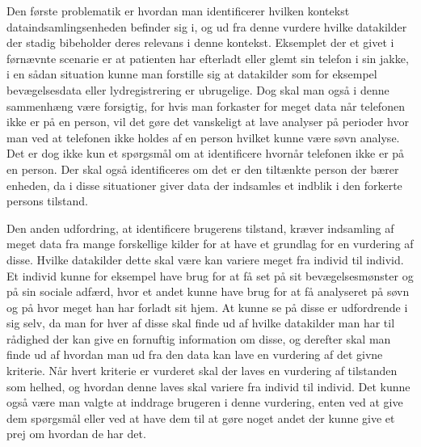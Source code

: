 Den første problematik er hvordan man identificerer hvilken kontekst dataindsamlingsenheden befinder sig i, og ud fra denne vurdere hvilke datakilder der stadig bibeholder deres relevans i denne kontekst.
Eksemplet der et givet i førnævnte scenarie er at patienten har efterladt eller glemt sin telefon i sin jakke, i en sådan situation kunne man forstille sig at datakilder som for eksempel bevægelsesdata eller lydregistrering er ubrugelige.
Dog skal man også i denne sammenhæng være forsigtig, for hvis man forkaster for meget data når telefonen ikke er på en person, vil det gøre det vanskeligt at lave analyser på perioder hvor man ved at telefonen ikke holdes af en person hvilket kunne være søvn analyse. 
Det er dog ikke kun et spørgsmål om at identificere hvornår telefonen ikke er på en person.
Der skal også identificeres om det er den tiltænkte person der bærer enheden, da i disse situationer giver data der indsamles et indblik i den forkerte persons tilstand.

Den anden udfordring, at identificere brugerens tilstand, kræver indsamling af meget data fra mange forskellige kilder for at have et grundlag for en vurdering af disse.
Hvilke datakilder dette skal være kan variere meget fra individ til individ.
Et individ kunne for eksempel have brug for at få set på sit bevægelsesmønster og på sin sociale adfærd, hvor et andet kunne have brug for at få analyseret på søvn og på hvor meget han har forladt sit hjem.
At kunne se på disse er udfordrende i sig selv, da man for hver af disse skal finde ud af hvilke datakilder man har til rådighed der kan give en fornuftig information om disse, og derefter skal man finde ud af hvordan man ud fra den data kan lave en vurdering af det givne kriterie.
Når hvert kriterie er vurderet skal der laves en vurdering af tilstanden som helhed, og hvordan denne laves skal variere fra individ til individ.
Det kunne også være man valgte at inddrage brugeren i denne vurdering, enten ved at give dem spørgsmål eller ved at have dem til at gøre noget andet der kunne give et prej om hvordan de har det.

